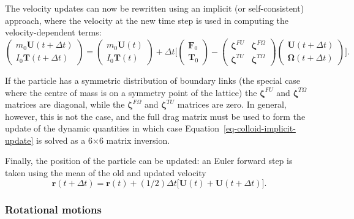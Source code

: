 The velocity updates can now be rewritten using an
implicit (or self-consistent) approach, where the velocity
at the new time step is used in computing the velocity-dependent
terms:
\begin{equation}
\label{eq-colloid-implicit-update}
\left( \begin{array}{rr}
m_0 \mathbf{U}(t + \Delta t) \\ I_0\mathbf{T}(t + \Delta t)
\end{array} \right) =
\left( \begin{array}{rr} m_0 \mathbf{U}(t) \\ I_0\mathbf{T}(t)
\end{array} \right) +
\Delta t
\bigg[
\left( \begin{array}{rr} \mathbf{F}_0 \\ \mathbf{T}_0
\end{array} \right) -
\left( \begin{array}{rr}
\mathbf{\boldsymbol{\zeta}}^{FU} & \mathbf{\boldsymbol{\zeta}}^{F\Omega} \\
\mathbf{\boldsymbol{\zeta}}^{TU} & \mathbf{\boldsymbol{\zeta}}^{T\Omega}
\end{array} \right)
\left( \begin{array}{rr}
\mathbf{U}(t + \Delta t) \\ \mathbf{\Omega}(t + \Delta t)
\end{array} \right)
\bigg].
\end{equation}


If the particle has a symmetric distribution of boundary links (the
special case where the centre of mass is on a symmetry point of the
lattice) the $\boldsymbol{\zeta}^{FU}$ and
$\boldsymbol{\zeta}^{T\Omega}$ matrices are
diagonal, while the $\boldsymbol{\zeta}^{F\Omega}$
and $\boldsymbol{\zeta}^{TU}$ matrices are zero. In general, however,
this is not the case, and the full drag matrix must be used to form
the update of the dynamic quantities in which case
Equation~\ref{eq-colloid-implicit-update} is solved
as a 6$\times$6 matrix inversion.

Finally, the position of the particle can be updated: an Euler
forward step is taken using the mean of the old and updated velocity
\begin{equation}
\label{eq-colloid-position-update}
\mathbf{r} (t + \Delta t) = \mathbf{r} (t) + (1/2)\Delta t
\big[ \mathbf{U}(t) + \mathbf{U}(t + \Delta t) \big].
\end{equation}


\subsubsection{Rotational motions}

